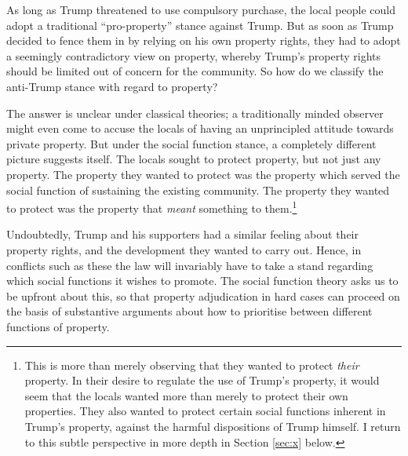 As long as Trump threatened to use compulsory purchase, the local people could adopt a traditional ``pro-property'' stance against Trump. But as soon as Trump decided to fence them in by relying on his own property rights, they had to adopt a seemingly contradictory view on property, whereby Trump's property rights should be limited out of concern for the community. So how do we classify the anti-Trump stance with regard to property?

The answer is unclear under classical theories; a traditionally minded observer might even come to accuse the locals of having an unprincipled attitude towards private property. But under the social function stance, a completely different picture suggests itself. The locals sought to protect property, but not just any property. The property they wanted to protect was the property which served the social function of sustaining the existing community. The property they wanted to protect was the property that {\it meant} something to them.\footnote{This is more than merely observing that they wanted to protect {\it their} property. In their desire to regulate the use of Trump's property, it would seem that the locals wanted more than merely to protect their own properties. They also wanted to protect certain social functions inherent in Trump's property, against the harmful dispositions of Trump himself. I return to this subtle perspective in more depth in Section \ref{sec:x} below.}

Undoubtedly, Trump and his supporters had a similar feeling about their property rights, and the development they wanted to carry out. Hence, in conflicts such as these the law will invariably have to take a stand regarding which social functions it wishes to promote. The social function theory asks us to be upfront about this, so that property adjudication in hard cases can proceed on the basis of substantive arguments about how to prioritise between different functions of property.


